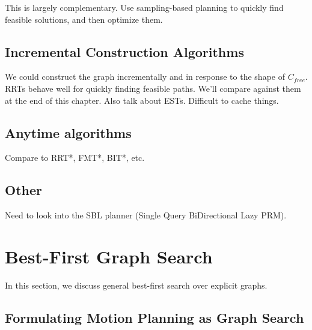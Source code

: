 \documentclass{report}
\begin{document}
This is largely complementary.
Use sampling-based planning to quickly find feasible solutions,
and then optimize them.

\subsection{Incremental Construction Algorithms}

We could construct the graph incrementally and in response to the shape
of $C_{free}$.
RRTs behave well for quickly finding feasible paths.
We'll compare against them at the end of this chapter.
Also talk about ESTs.
Difficult to cache things.

%

\subsection{Anytime algorithms}

Compare to RRT*, FMT*, BIT*, etc.

\subsection{Other}

Need to look into the SBL planner \cite{sanchezante2001sbl}
(Single Query BiDirectional Lazy PRM).

\section{Best-First Graph Search}
\label{sec:best-first}

In this section,
we discuss general best-first search over explicit graphs.

\subsection{Formulating Motion Planning as Graph Search}
\end{document}
